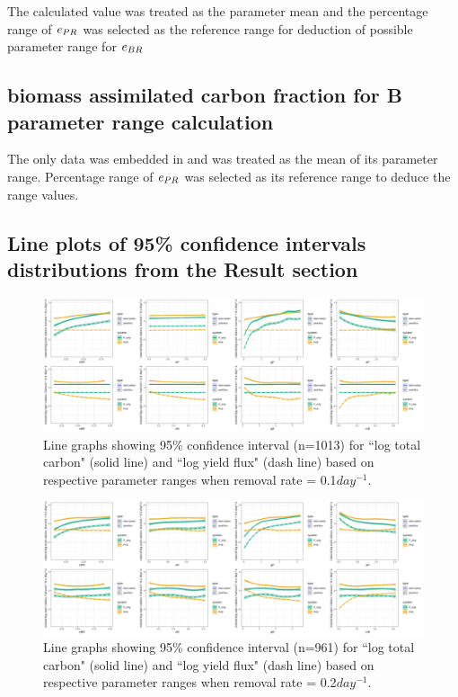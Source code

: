 \documentclass[../thesis.tex]{subfiles} %
\begin{document}
The calculated value was treated as the parameter mean and the percentage range of $e_{PR}$ was selected as the reference range for deduction of possible parameter range for $e_{BR}$

\subsection{biomass assimilated carbon fraction for B parameter range calculation}
The only data was embedded in \autocite{cochran1988estimation} and was treated as the mean of its parameter range.  Percentage range of $e_{PR}$ was selected as its reference range to deduce the range values.

\subsection{Line plots of 95\% confidence intervals distributions from the Result section}
\begin{figure}[H]
    \centering
    \includegraphics[width=\linewidth]{../result/var_01.png}
    \caption[95\% distribution for $x=0.1day^{-1}$]{Line graphs showing 95\% confidence interval (n=1013) for ``log total carbon" (solid line) and ``log yield flux" (dash line) based on respective parameter ranges when removal rate = 0.1$day^{-1}$.}
    \label{fig:v01}
\end{figure}

\begin{figure}[H]
    \centering
    \includegraphics[width=\linewidth]{../result/var_02.png}
    \caption[95\% distribution for $x=0.2day^{-1}$]{Line graphs showing 95\% confidence interval (n=961) for ``log total carbon" (solid line) and ``log yield flux" (dash line) based on respective parameter ranges when removal rate = 0.2$day^{-1}$.}
    \label{fig:v02}
\end{figure}
\end{document}

